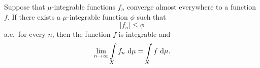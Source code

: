 \begin{theorem}\label{Leb-DomCon}
	Suppose that $\mu$-integrable functions $f_n$ converge almost everywhere to a function $f$. If there exists a $\mu$-integrable function $\phi$ such that
	\[ |f_n| \le \phi \]
	a.e.~for every $n$, then the function $f$ is integrable and
	\[ \lim\limits_{n \rightarrow \infty} \int\limits_X f_n~\text{\normalfont{}d}{\mu} = \int\limits_X f~\text{\normalfont{}d}{\mu}. \]
\end{theorem}
